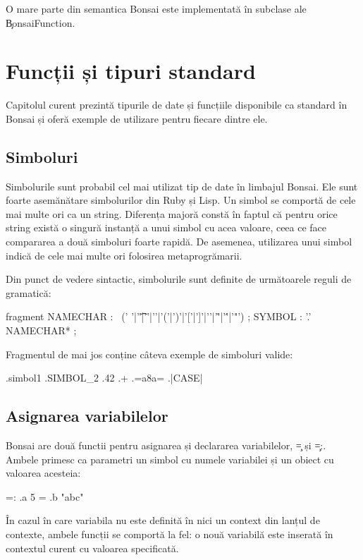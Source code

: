 \documentclass[12pt,a4paper]{memoir}
\begin{document}
O mare parte din semantica Bonsai este implementată în subclase ale \c{BonsaiFunction}. 

\chapter{Funcții și tipuri standard}

Capitolul curent prezintă tipurile de date și funcțiile disponibile ca standard în Bonsai și oferă exemple de utilizare pentru fiecare dintre ele.

\section{Simboluri}

Simbolurile sunt probabil cel mai utilizat tip de date în limbajul Bonsai. Ele sunt foarte asemănătare simbolurilor din Ruby\cite{ruby_symbols} și Lisp\cite{clhs_symbols}. Un simbol se comportă de cele mai multe ori ca un string. Diferența majoră constă în faptul că pentru orice string există o singură instanță a unui simbol cu acea valoare, ceea ce face compararea a două simboluri foarte rapidă. De asemenea, utilizarea unui simbol indică de cele mai multe ori folosirea metaprogrămarii.

Din punct de vedere sintactic, simbolurile sunt definite de următoarele reguli de gramatică:
\begin{code}
fragment NAMECHAR
    :   ~(' '|'\t'|'{'|'}'|'('|')'|'['|']'|'\n'|'\r'|'\''|'"')
    ;
SYMBOL
    :   '.' NAMECHAR*
    ;
\end{code}
Fragmentul de mai jos conține câteva exemple de simboluri valide:
\begin{code}
.simbol1
.SIMBOL_2
.42
.+
.=a8a=
.|CASE|
\end{code}

\section{Asignarea variabilelor}

Bonsai are două functii pentru asignarea și declararea variabilelor, \c{=} și \c{=:}. Ambele primesc ca parametri un simbol cu numele variabilei și un obiect cu valoarea acesteia:
\begin{code}
=: .a 5
= .b "abc"
\end{code}

În cazul în care variabila nu este definită în nici un context din lanțul de contexte, ambele funcții se comportă la fel: o nouă variabilă este inserată în contextul curent cu valoarea specificată. 
\end{document}
